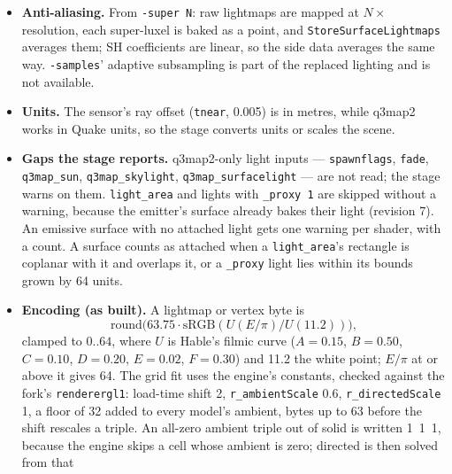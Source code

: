 \documentclass[11pt,a4paper]{article}
\begin{document}
\begin{itemize}
  grid's order, with nine RGB coefficients in the pages' basis, a sky visibility and a valid flag
  (side file version~3, B13). The sky visibility is the uniform fraction of the probe's first rays
  that escape over the whole sphere, since a probe has no normal. A probe left in solid after
  q3map2's nudge, or with a non-finite result, is invalid, with zero coefficients and visibility. Never \texttt{lm\_*.hdr}, which stock rend2 would
  load. The irradiance-to-byte encoding is chosen here (§\ref{sec:units}).
\item \textbf{Anti-aliasing.} From \texttt{-super N}: raw lightmaps are mapped at $N\times$
  resolution, each super-luxel is baked as a point, and \texttt{StoreSurfaceLightmaps} averages
  them; SH coefficients are linear, so the side data averages the same way. \texttt{-samples}'
  adaptive subsampling is part of the replaced lighting and is not available.
\item \textbf{Units.} The sensor's ray offset (\texttt{tnear}, 0.005) is in metres, while q3map2
  works in Quake units, so the stage converts units or scales the scene.
\item \textbf{Gaps the stage reports.} q3map2-only light inputs --- \texttt{spawnflags},
  \texttt{fade}, \texttt{q3map\_sun}, \texttt{q3map\_skylight}, \texttt{q3map\_surfacelight} ---
  are not read; the stage warns on them. \texttt{light\_area} and lights with \texttt{\_proxy 1}
  are skipped without a warning, because the emitter's surface already bakes their light (revision
  7). An emissive surface with no attached light gets one warning per shader, with a count. A
  surface counts as attached when a \texttt{light\_area}'s rectangle is coplanar with it and
  overlaps it, or a \texttt{\_proxy} light lies within its bounds grown by 64 units.
\item \textbf{Encoding (as built).} A lightmap or vertex byte is
  \[ \mathrm{round}\bigl(63.75\cdot\mathrm{sRGB}(U(E/\pi)/U(11.2))\bigr), \]
  clamped to $0..64$, where $U$ is
  Hable's filmic curve ($A=0.15$, $B=0.50$, $C=0.10$, $D=0.20$, $E=0.02$, $F=0.30$) and 11.2 the
  white point; $E/\pi$ at or above it gives 64. The grid fit uses the engine's constants, checked
  against the fork's \texttt{renderergl1}: load-time shift 2, \texttt{r\_ambientScale} 0.6,
  \texttt{r\_directedScale} 1, a floor of 32 added to every model's ambient, bytes up to 63
  before the shift rescales a triple. An all-zero ambient triple out of solid is written
  1~1~1, because the engine skips a cell whose ambient is zero; directed is then solved from that

\end{itemize}
\end{document}
